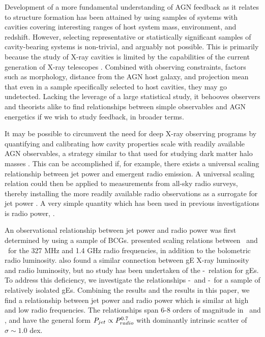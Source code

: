 \documentclass{emulateapj}
\begin{document}
Development of a more fundamental understanding of AGN feedback as it
relates to structure formation has been attained by using samples of
systems with cavities covering interesting ranges of host system mass,
environment, and redshift. However, selecting representative or
statistically significant samples of cavity-bearing systems is
non-trivial, and arguably not possible. This is primarily because the
study of X-ray cavities is limited by the capabilities of the current
generation of X-ray telescopes \citep{2009arXiv0909.0397B}. Combined
with observing constraints, factors such as morphology, distance from
the AGN host galaxy, and projection mean that even in a sample
specifically selected to host cavities, they may go
undetected. Lacking the leverage of a large statistical study, it
behooves observers and theorists alike to find relationships between
simple observables and AGN energetics if we wish to study feedback,
in broader terms.

It may be possible to circumvent the need for deep X-ray observing
programs by quantifying and calibrating how cavity properties scale
with readily available AGN observables, a strategy similar to that
used for studying dark matter halo masses \citep[\eg][]{kravtsov06,
  2007ApJ...668..772M, 2009A&A...498..361P}. This can be accomplished
if, for example, there exists a universal scaling relationship between
jet power and emergent radio emission. A universal scaling relation
could then be applied to measurements from all-sky radio surveys,
thereby installing the more readily available radio observations as a
surrogate for jet power \citep{croton06, 2006MNRAS.366..397S}. A very
simple quantity which has been used in previous investigations is
radio power, \prad.

An observational relationship between jet power and radio power was
first determined by \citet{birzan04, birzan08} using a sample of
BCGs. \citet{birzan04, birzan08} presented scaling relations between
\pjet\ and \prad\ for the 327 MHz and 1.4 GHz radio frequencies, in
addition to the bolometric radio
luminosity. \citet{2008ApJ...680..897D} also found a similar
connection between gE X-ray luminosity and radio luminosity, but no
study has been undertaken of the \pjet-\prad\ relation for gEs. To
address this deficiency, we investigate the relationships
\pjet-\phigh\ and \pjet-\plow\ for a sample of relatively isolated
gEs. Combining the \citet{birzan08} results and the results in this
paper, we find a relationship between jet power and radio power which
is similar at high and low radio frequencies. The relationships span
6-8 orders of magnitude in \pjet\ and \prad, and have the general form
$P_{jet} \propto P_{radio}^{0.7}$ with dominantly intrinsic scatter of
$\sigma \sim 1.0$ dex.
\end{document}
